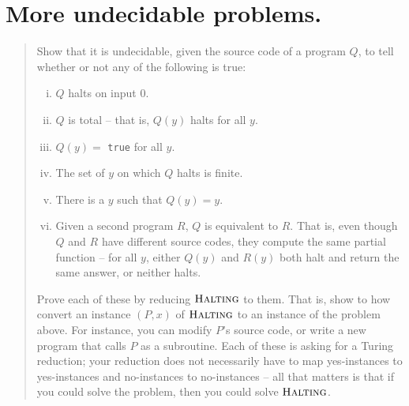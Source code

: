 

\maketitle
\thispagestyle{firststyle}
\vspace{-2.0cm}
\section{More undecidable problems. }
\begin{quote}
    Show that it is undecidable, given the source code of a program $Q$, to tell whether or not any of the following is true:
    \begin{enumerate}[(i)]
      \item $Q$ halts on input 0.
      \item $Q$ is total -- that is, $Q(y)$ halts for all $y$.
      \item $Q(y)=$ {\tt true} for all $y$.
      \item The set of $y$ on which $Q$ halts is finite.
      \item There is a $y$ such that $Q(y)= y$.
      \item Given a second program $R$, $Q$ is equivalent to $R$.
      That is, even though $Q$ and $R$ have different source codes,
      they compute the same partial function --
      for all $y$, either $Q(y)$ and $R(y)$ both halt and return the same answer, or neither halts.
    \end{enumerate}
    Prove each of these by reducing $\textsc{Halting}$ to them.
    That is, show to how convert an instance $(P, x)$ of $\textsc{Halting}$ to an instance of the problem above.
    For instance, you can modify $P$'s source code,
    or write a new program that calls $P$ as a subroutine.
    Each of these is asking for a Turing reduction;
    your reduction does not necessarily have to map yes-instances to yes-instances and no-instances to no-instances --
    all that matters is that if you could solve the problem,
    then you could solve $\textsc{Halting}$.
\end{quote}



